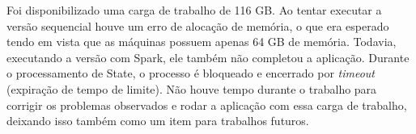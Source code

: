 Foi disponibilizado uma carga de trabalho de 116 GB. Ao tentar executar a versão 
sequencial houve um erro de alocação de memória, o que era esperado tendo em 
vista que as máquinas possuem apenas 64 GB de memória. Todavia, executando a 
versão com Spark, ele também não completou a aplicação. Durante o processamento 
de State, o processo é bloqueado e encerrado por \textit{timeout} 
(expiração de tempo de limite). Não houve tempo durante o trabalho para 
corrigir os problemas observados e rodar a aplicação com essa carga de 
trabalho, deixando isso também como um item para trabalhos futuros.
